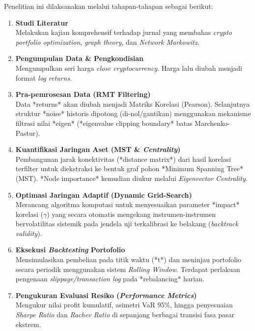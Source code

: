 \documentclass[12pt, a4paper]{report}
\begin{document}
Penelitian ini dilaksanakan melalui tahapan-tahapan sebagai berikut:

\begin{enumerate}
    \item \textbf{Studi Literatur} \\
    Melakukan kajian komprehensif terhadap jurnal yang membahas \textit{crypto portfolio optimization}, \textit{graph theory}, dan \textit{Network Markowitz}.

    \item \textbf{Pengumpulan Data \& Pengkondisian} \\
    Mengumpulkan seri harga \textit{close} \textit{cryptocurrency}. Harga lalu diubah menjadi format \textit{log returns}.

    \item \textbf{Pra-pemrosesan Data (RMT Filtering)} \\
    Data *returns* akan diubah menjadi Matriks Korelasi (Pearson). Selanjutnya struktur *noise* historis dipotong (di-nol/gantikan) menggunakan mekanisme filtrasi nilai *eigen* (*eigenvalue clipping boundary* batas Marchenko-Pastur).

    \item \textbf{Kuantifikasi Jaringan Aset (MST \& \textit{Centrality})} \\
    Pembangunan jarak konektivitas (*distance matrix*) dari hasil korelasi terfilter untuk diekstraksi ke bentuk graf pohon *Minimum Spanning Tree* (MST). *Node importance* kemudian diukur melalui \textit{Eigenvector Centrality}.

    \item \textbf{Optimasi Jaringan Adaptif (Dynamic Grid-Search)} \\
    Merancang algoritma komputasi untuk menyesuaikan parameter *impact* korelasi ($\gamma$) yang secara otomatis mengekang instrumen-instrumen bervolatilitas sistemik pada jendela uji terkalibrasi ke belakang (\textit{backtrack validity}).

    \item \textbf{Eksekusi \textit{Backtesting} Portofolio} \\
    Mensimulasikan pembelian pada titik waktu (*t*) dan meninjau portofolio secara periodik menggunakan sistem \textit{Rolling Window}. Terdapat perlakuan pengenaan \textit{slippage/transaction log} pada *rebalancing* harian.

    \item \textbf{Pengukuran Evaluasi Resiko (\textit{Performance Metrics})} \\
    Mengukur nilai profit kumulatif, asimetri VaR 95\%, hingga penyesuaian \textit{Sharpe Ratio} dan \textit{Rachev Ratio} di sepanjang berbagai transisi fasa pasar ekstrem.
\end{enumerate}
\end{document}
